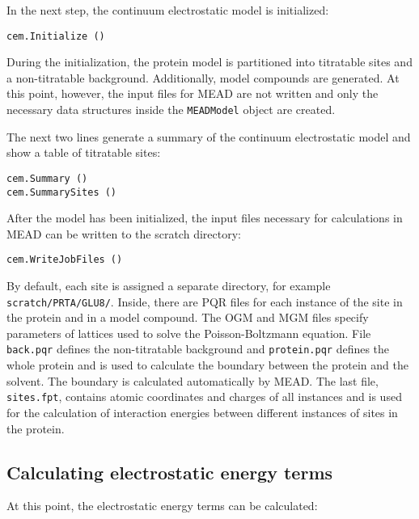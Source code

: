 \documentclass[12pt]{article}
\begin{document}
{\bigskip
In the next step,
the continuum electrostatic model is initialized:

{\footnotesize \singlespacing \begin{lstlisting}
cem.Initialize ()
\end{lstlisting} }

\bigskip
During the initialization,
the protein model is partitioned into titratable sites and
a non-titratable background.
%
Additionally,
model compounds are generated.
%
At this point, however, the input files for MEAD are not written and only
the necessary data structures inside the \texttt{MEADModel} object are created.

\bigskip
The next two lines generate a summary of the continuum electrostatic model and
show a table of titratable sites:

{\footnotesize \singlespacing \begin{lstlisting}
cem.Summary ()
cem.SummarySites ()
\end{lstlisting} }

\bigskip
After the model has been initialized,
the input files necessary for calculations in MEAD can be written to
the scratch directory:

{\footnotesize \singlespacing \begin{lstlisting}
cem.WriteJobFiles ()
\end{lstlisting} }

By default,
each site is assigned a separate directory,
for example {\tt scratch/PRTA/GLU8/}.
%
Inside,
there are PQR files for each instance of the site in the protein
and in a model compound.
%
The OGM and MGM files specify parameters of lattices used to solve the Poisson-Boltzmann equation.
%
File \texttt{back.pqr} defines the non-titratable background
and \texttt{protein.pqr} defines the whole protein and is used to calculate the boundary
between the protein and the solvent.
%
The boundary is calculated automatically by MEAD.
%
The last file,
\texttt{sites.fpt},
contains atomic coordinates and charges of all instances
and is used for the calculation of interaction energies between
different instances of sites in the protein.


\subsection{Calculating electrostatic energy terms}
At this point, the electrostatic energy terms can be calculated:

}
\end{document}
